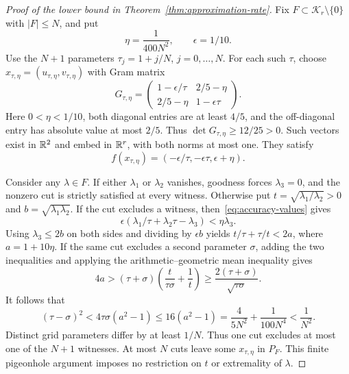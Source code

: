 \begin{proof}[Proof of the lower bound in Theorem~\ref{thm:approximation-rate}]
Fix $F\subset\mathcal K_r\setminus\{0\}$ with $|F|\leq N$, and put
\[
 \eta=\frac1{400N^2},\qquad \epsilon=1/10.
\]
Use the $N+1$ parameters $\tau_j=1+j/N$, $j=0,\ldots,N$.
For each such $\tau$, choose $x_{\tau,\eta}=(u_{\tau,\eta},v_{\tau,\eta})$
with Gram matrix
\begin{equation}\label{eq:accuracy-gram}
 G_{\tau,\eta}=
 \begin{pmatrix}1-\epsilon/\tau&2/5-\eta\\
                 2/5-\eta&1-\epsilon\tau\end{pmatrix}.
\end{equation}
Here $0<\eta<1/10$, both diagonal entries are at least $4/5$,
and the off-diagonal entry has absolute value at most $2/5$.
Thus $\det G_{\tau,\eta}\geq12/25>0$. Such vectors exist in
$\mathbb R^2$ and embed in $\mathbb R^r$, with both norms at most one. They satisfy
\begin{equation}\label{eq:accuracy-values}
 f(x_{\tau,\eta})=(-\epsilon/\tau,-\epsilon\tau,\epsilon+\eta).
\end{equation}

Consider any $\lambda\in F$. If either $\lambda_1$ or $\lambda_2$
vanishes, goodness forces $\lambda_3=0$, and the nonzero cut is
strictly satisfied at every witness. Otherwise put
$t=\sqrt{\lambda_1/\lambda_2}>0$ and
$b=\sqrt{\lambda_1\lambda_2}$. If the cut excludes a witness,
then~\eqref{eq:accuracy-values} gives
\[
 \epsilon(\lambda_1/\tau+\lambda_2\tau-\lambda_3)
 <\eta\lambda_3.
\]
Using $\lambda_3\leq2b$ on both sides and dividing by
$\epsilon b$ yields $t/\tau+\tau/t<2a$, where $a=1+10\eta$.
If the same cut excludes a second parameter $\sigma$, adding the
two inequalities and applying the arithmetic--geometric mean
inequality gives
\[
 4a>(\tau+\sigma)\left(\frac{t}{\tau\sigma}+\frac1t\right)
 \geq\frac{2(\tau+\sigma)}{\sqrt{\tau\sigma}}.
\]
It follows that
\begin{equation}\label{eq:grid-exclusion}
 (\tau-\sigma)^2<4\tau\sigma(a^2-1)
 \leq16(a^2-1)
 =\frac4{5N^2}+\frac1{100N^4}<\frac1{N^2}.
\end{equation}
Distinct grid parameters differ by at least $1/N$. Thus one cut
excludes at most one of the $N+1$ witnesses. At most $N$ cuts
leave some $x_{\tau,\eta}$ in $P_F$. This finite pigeonhole
argument imposes no restriction on $t$ or extremality of $\lambda$.


\end{proof}
